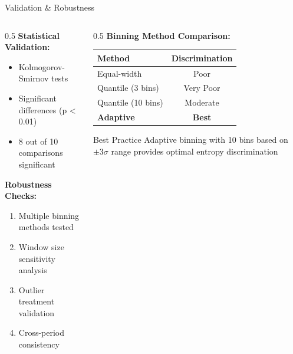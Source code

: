\documentclass[aspectratio=169,12pt,xcolor=table]{beamer}
\begin{document}
\begin{frame}{Validation \& Robustness}
\begin{columns}[T]
\begin{column}{0.5\textwidth}
    \textbf{Statistical Validation:}
    \begin{itemize}
        \item Kolmogorov-Smirnov tests
        \item Significant differences (p < 0.01)
        \item 8 out of 10 comparisons significant
    \end{itemize}
    
    \vspace{0.3cm}
    \textbf{Robustness Checks:}
    \begin{enumerate}
        \item Multiple binning methods tested
        \item Window size sensitivity analysis
        \item Outlier treatment validation
        \item Cross-period consistency
    \end{enumerate}
\end{column}

\begin{column}{0.5\textwidth}
    \textbf{Binning Method Comparison:}
    \begin{table}[h]
    \tiny
    \begin{tabular}{lc}
    \toprule
    \textbf{Method} & \textbf{Discrimination} \\
    \midrule
    Equal-width & Poor \\
    Quantile (3 bins) & Very Poor \\
    Quantile (10 bins) & Moderate \\
    \rowcolor{niftygreen!20}
    \textbf{Adaptive} & \textbf{Best} \\
    \bottomrule
    \end{tabular}
    \end{table}
    
    \vspace{0.3cm}
    \begin{alertblock}{Best Practice}
        \small
        Adaptive binning with 10 bins based on $\pm 3\sigma$ range provides optimal entropy discrimination
    \end{alertblock}
\end{column}
\end{columns}
\end{frame}
\end{document}
